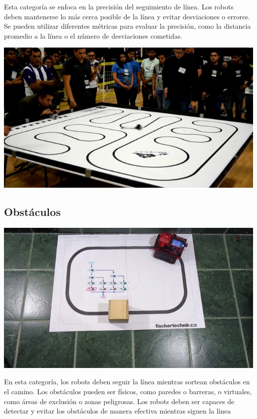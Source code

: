 \documentclass[a4paper,11pt]{report}    %
\begin{document}
\begin{minipage}{0.4\textwidth}
    Esta categoría se enfoca en la precisión del seguimiento de línea. Los robots deben mantenerse lo más cerca posible de la línea y evitar desviaciones o errores. Se pueden utilizar diferentes métricas para evaluar la precisión, como la distancia promedio a la línea o el número de desviaciones cometidas.

\end{minipage}
\hfill
\begin{minipage}{0.5\textwidth}
    \includegraphics[width=\linewidth]{img/image3.png}
\end{minipage}


\subsection{Obstáculos}

\begin{minipage}{0.4\textwidth}
    
        \includegraphics[width=\linewidth]{img/image4.png}
\end{minipage}
\hfill
\begin{minipage}{0.5\textwidth}
En esta categoría, los robots deben seguir la línea mientras sortean obstáculos en el camino. Los obstáculos pueden ser físicos, como paredes o barreras, o virtuales, como áreas de exclusión o zonas peligrosas. Los robots deben ser capaces de detectar y evitar los obstáculos de manera efectiva mientras siguen la línea

\end{minipage}
\end{document}
